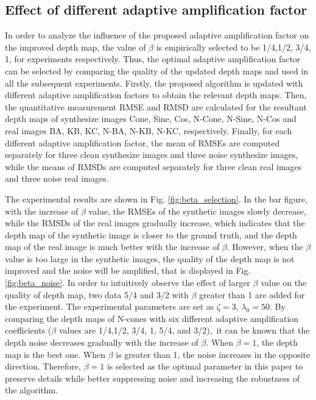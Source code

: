 \documentclass[a4paper,fleqn]{cas-dc}
\begin{document}
\subsection{Effect of different adaptive amplification factor}\label{Effect}
In order to analyze the influence of the proposed adaptive amplification factor on the improved depth map, the value of $\beta$ is empirically selected to be 1/4,1/2, 3/4, 1, for experiments respectively. Thus, the optimal adaptive amplification factor can be selected by comparing the quality of the updated depth maps and used in all the subsequent experiments. Firstly, the proposed algorithm is updated with different adaptive amplification factors to obtain the relevant depth maps. Then, the quantitative measurement RMSE and RMSD are calculated for the resultant depth maps of synthesize images Cone, Sine, Cos, N-Cone, N-Sine, N-Cos and real images BA, KB, KC, N-BA, N-KB, N-KC, respectively. Finally, for each different adaptive amplification factor, the mean of RMSEs are computed separately for three clean synthesize images and three noise synthesize images, while the means of RMSDs are computed separately for three clean real images and three noise real images.

The experimental results are shown in Fig. \ref{fig:beta_selection}. In the bar figure, with the increase of $\beta$ value, the RMSEs of the synthetic images slowly decrease, while the RMSDs of the real images gradually increase, which indicates that the depth map of the synthetic image is closer to the ground truth, and the depth map of the real image is much better with the increase of $\beta$. However, when the $\beta$ value is too large in the synthetic images, the quality of the depth map is not improved and the noise will be amplified, that is displayed in Fig. \ref{fig:beta_noise}. In order to intuitively observe the effect of larger $\beta$ value on the quality of depth map, two data 5/4 and 3/2 with $\beta$ greater than 1 are added for the experiment. The experimental parameters are set as $\zeta = 3$, $\lambda_0 = 50$. By comparing the depth maps of N-cones with six different adaptive amplification coefficients ($\beta$ values are 1/4,1/2, 3/4, 1, 5/4, and 3/2), it can be known that the depth noise decreases gradually with the increase of $\beta$. When $\beta = 1$, the depth map is the best one. When $\beta$ is greater than 1, the noise increases in the opposite direction. Therefore, $\beta = 1$ is selected as the optimal parameter in this paper to preserve details while better suppressing noise and increasing the robustness of the algorithm.
\end{document}
